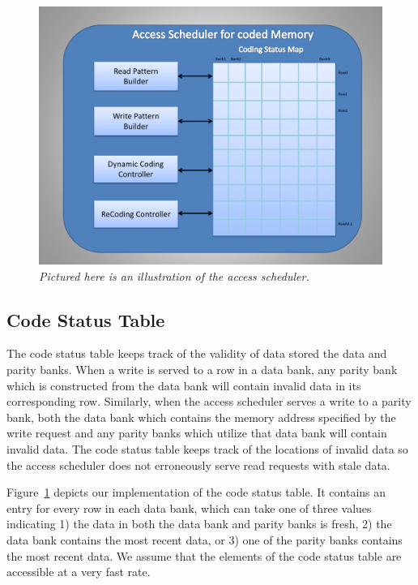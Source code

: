 \begin{figure}[tbp]
\centering
\includegraphics[width=0.7\linewidth]{fig/coded_access_scheduler.pdf}
\caption{
{\it{Pictured here is an illustration of the access scheduler.} }}
\label{fig:coded_access_scheduler}
\end{figure}
\subsection{Code Status Table}
\label{sec:codeStatusTable}
The code status table keeps track of the validity of data stored the data and parity banks. When a write is served to a row in a data bank, any parity bank which is constructed from the data bank will contain invalid data in its corresponding row. Similarly, when the access scheduler serves a write to a parity bank, both the data bank which contains the memory address specified by the write request and any parity banks which utilize that data bank will contain invalid data. The code status table keeps track of the locations of invalid data so the access scheduler does not erroneously serve read requests with stale data.

Figure~\ref{fig:coded_access_scheduler} depicts our implementation of the code status table. It contains an entry for every row in each data bank, which can take one of three values indicating 1) the data in both the data bank and parity banks is fresh, 2) the data bank contains the most recent data, or 3) one of the parity banks contains the most recent data. 
We assume that the elements of the code status table are accessible at a very fast rate. 


